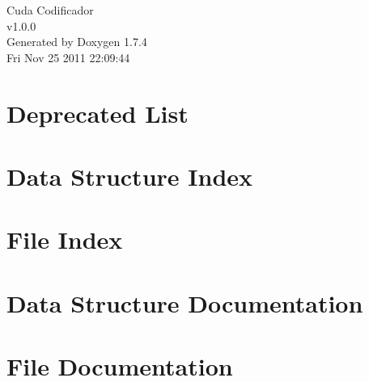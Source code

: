 \documentclass[a4paper]{book}
\begin{document}
\begin{titlepage}
\vspace*{7cm}
\begin{center}
{\Large Cuda Codificador \\[1ex]\large v1.0.0 }\\
\vspace*{1cm}
{\large Generated by Doxygen 1.7.4}\\
\vspace*{0.5cm}
{\small Fri Nov 25 2011 22:09:44}\\
\end{center}
\end{titlepage}
\clearemptydoublepage
{}
\tableofcontents
\clearemptydoublepage
{}
\chapter{Deprecated List}
\label{deprecated}

\chapter{Data Structure Index}

\chapter{File Index}

\chapter{Data Structure Documentation}



\chapter{File Documentation}





\printindex
\end{document}
